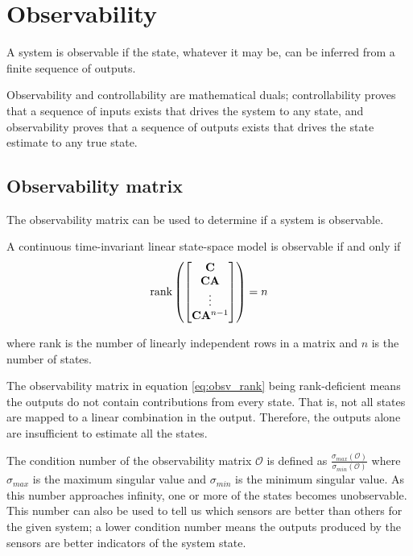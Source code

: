 \section{Observability}

A \gls{system} is observable if the \gls{state}, whatever it may be, can be
inferred from a finite sequence of \glspl{output}.

Observability and controllability are mathematical duals; controllability proves
that a sequence of \glspl{input} exists that drives the \gls{system} to any
\gls{state}, and observability proves that a sequence of \glspl{output} exists
that drives the \gls{state} estimate to any true \gls{state}.

\subsection{Observability matrix}

The observability matrix can be used to determine if a system is observable.
\begin{theorem}[Observability]
  A continuous \gls{time-invariant} linear state-space \gls{model} is observable
  if and only if
  \begin{equation}
    \operatorname{rank}\left(
    \begin{bmatrix}
      \mathbf{C} \\
      \mathbf{C}\mathbf{A} \\
      \vdots \\
      \mathbf{C}\mathbf{A}^{n-1}
    \end{bmatrix}\right) = n \label{eq:obsv_rank}
  \end{equation}

  where rank is the number of linearly independent rows in a matrix and $n$ is
  the number of \glspl{state}.
\end{theorem}

The observability matrix in equation \eqref{eq:obsv_rank} being rank-deficient
means the \glspl{output} do not contain contributions from every \gls{state}.
That is, not all \glspl{state} are mapped to a linear combination in the
\gls{output}. Therefore, the \glspl{output} alone are insufficient to estimate
all the \glspl{state}.

The condition number of the observability matrix $\mathcal{O}$ is defined as
$\frac{\sigma_{max}(\mathcal{O})}{\sigma_{min}(\mathcal{O})}$ where
$\sigma_{max}$ is the maximum singular value and
$\sigma_{min}$ is the minimum singular value. As this number approaches
infinity, one or more of the \glspl{state} becomes unobservable. This number can
also be used to tell us which sensors are better than others for the given
\gls{system}; a lower condition number means the \glspl{output} produced by the
sensors are better indicators of the \gls{system} \gls{state}.

